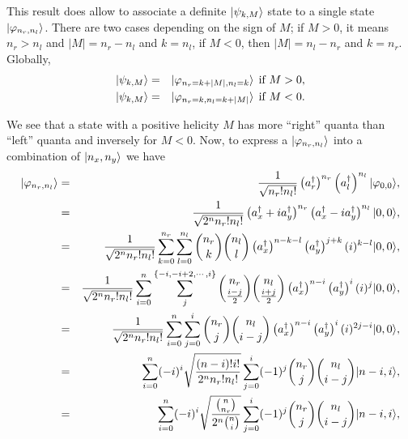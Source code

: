 This result does allow to associate a definite $| \psi_{k,M} \rangle$ state to a single state $| \varphi_{n_r,n_l} \rangle$. There are two cases depending on the sign of $M$; if $M>0$, it means $n_r>n_l$ and $|M|=n_r-n_l$ and $k=n_l$, if $M<0$, then $|M|=n_l-n_r$ and $k=n_r$. Globally,
\begin{eqnarray}
| \psi_{k,M} \rangle &=& | \varphi_{n_r=k+|M|,n_l=k} \rangle \:\: \textrm{if } M>0, \\ 
| \psi_{k,M} \rangle &=& | \varphi_{n_r=k,n_l=k+|M|} \rangle \:\: \textrm{if } M<0.
\end{eqnarray}

We see that a state with a positive helicity $M$ has more ``right'' quanta than ``left'' quanta and inversely for $M<0$. Now, to express a $| \varphi_{n_r,n_l} \rangle$ into a combination of $| n_x,n_y \rangle$ we have
\begin{eqnarray}
| \varphi_{n_r,n_l} \rangle&=& \frac{1}{\sqrt{n_r! n_l!}} \left( a_r^\dagger \right)^{n_r}  \left( a_l^\dagger \right)^{n_l} | \varphi_{0,0} \rangle, \\
&=&   \frac{1}{\sqrt{2^n n_r! n_l!}} \left( a_x^\dagger +ia_y^\dagger \right)^{n_r}  \left( a_x^\dagger -ia_y^\dagger\right)^{n_l} | 0,0 \rangle, \label{eq-2D2}\\
&=&   \frac{1}{\sqrt{2^n n_r! n_l!}} \sum_{k=0}^{n_r} \sum_{l=0}^{n_l}  \binom{n_r}{k} \binom{n_l}{l} \left( a_x^\dagger \right)^{n-k-l}  \left(a_y^\dagger \right)^{j+k} (i)^{k-l} | 0,0 \rangle, \label{eq-2D3}\\
&=&   \frac{1}{\sqrt{2^n n_r! n_l!}} \sum_{i=0}^{n} \sum_{j}^{\{-i,-i+2,\cdots, i\}}  \binom{n_r}{\frac{i-j}{2}} \binom{n_l}{\frac{i+j}{2}} \left( a_x^\dagger \right)^{n-i}  \left(a_y^\dagger \right)^i (i)^{j} | 0,0 \rangle, \label{eq-2D4}\\
&=&   \frac{1}{\sqrt{2^n n_r! n_l!}} \sum_{i=0}^{n} \sum_{j=0}^{i}  \binom{n_r}{j} \binom{n_l}{i-j} \left( a_x^\dagger \right)^{n-i}  \left(a_y^\dagger \right)^i (i)^{2j-i} | 0,0 \rangle,\label{eq-2D5} \\
&=&   \sum_{i=0}^{n}(-i)^i  \sqrt{ \frac{(n-i)! i!}{2^n n_r! n_l!}}    \sum_{j=0}^{i} (-1)^j \binom{n_r}{j} \binom{n_l}{i-j}  | n-i,i \rangle,\label{eq-2D6} \\
&=&   \sum_{i=0}^{n}(-i)^i  \sqrt{\frac{\binom{n}{n_r} }{2^n \binom{n}{i}}}    \sum_{j=0}^{i}(-1)^j \binom{n_r}{j} \binom{n_l}{i-j}  | n-i,i \rangle, \label{eq-2D7}
\end{eqnarray}
